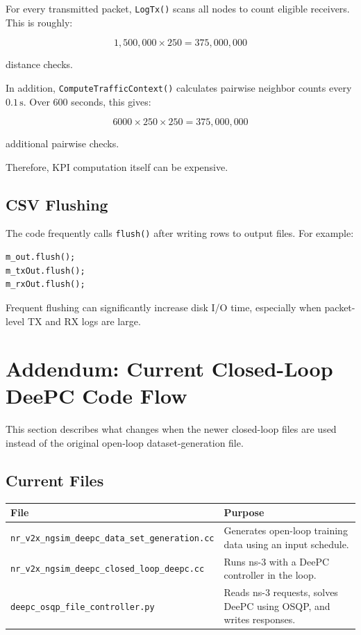 \documentclass[11pt,a4paper]{article}
\begin{document}
For every transmitted packet, \texttt{LogTx()} scans all nodes to count eligible receivers. This is roughly:

\begin{equation}
1{,}500{,}000 \times 250
=
375{,}000{,}000
\end{equation}

distance checks.

In addition, \texttt{ComputeTrafficContext()} calculates pairwise neighbor counts every \(0.1\,\mathrm{s}\). Over 600 seconds, this gives:

\begin{equation}
6000 \times 250 \times 250
=
375{,}000{,}000
\end{equation}

additional pairwise checks.

Therefore, KPI computation itself can be expensive.

\subsection{CSV Flushing}

The code frequently calls \texttt{flush()} after writing rows to output files. For example:

\begin{lstlisting}[style=cppstyle]
m_out.flush();
m_txOut.flush();
m_rxOut.flush();
\end{lstlisting}

Frequent flushing can significantly increase disk I/O time, especially when packet-level TX and RX logs are large.

\section{Addendum: Current Closed-Loop DeePC Code Flow}

This section describes what changes when the newer closed-loop files are used instead of the original open-loop dataset-generation file.

\subsection{Current Files}

\begin{center}
\begin{tabular}{ll}
\toprule
File & Purpose \\
\midrule
\texttt{nr\_v2x\_ngsim\_deepc\_data\_set\_generation.cc} & Generates open-loop training data using an input schedule. \\
\texttt{nr\_v2x\_ngsim\_deepc\_closed\_loop\_deepc.cc} & Runs ns-3 with a DeePC controller in the loop. \\
\texttt{deepc\_osqp\_file\_controller.py} & Reads ns-3 requests, solves DeePC using OSQP, and writes responses. \\
\bottomrule
\end{tabular}
\end{center}
\end{document}
